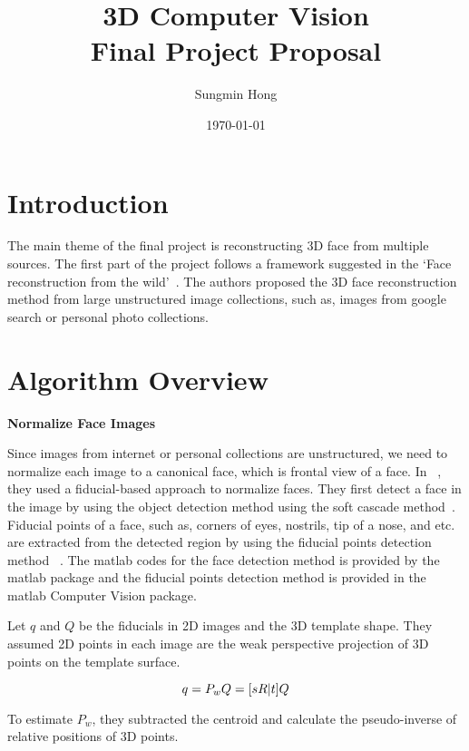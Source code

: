 \documentclass[10pt]{article}
\title{3D Computer Vision \\ Final Project Proposal}
\author{Sungmin Hong}
\date{\today}
\begin{document}
\maketitle

\section{Introduction}

The main theme of the final project is reconstructing 3D face from multiple sources. 
The first part of the project follows a framework suggested in the `Face reconstruction from the wild'~\cite{Kemel2011}.
The authors proposed the 3D face reconstruction method from large unstructured image collections, such as, images from google search or personal photo collections. 

\section{Algorithm Overview}

\noindent \textbf{Normalize Face Images \\} 

Since images from internet or personal collections are unstructured, we need to normalize each image to a canonical face, which is frontal view of a face.
In ~\cite{Kemel2011}, they used a fiducial-based approach to normalize faces. They first detect a face in the image by using the object detection method using the soft cascade method~\cite{Bourdev05}.
Fiducial points of a face, such as, corners of eyes, nostrils, tip of a nose, and etc. are extracted from the detected region by using the fiducial points detection method ~\cite{Everingham06}. 
The matlab codes for the face detection method is provided by the matlab package and the fiducial points detection method is provided in the matlab Computer Vision package. 

Let $q$ and $Q$ be the fiducials in 2D images and the 3D template shape. 
They assumed 2D points in each image are the weak perspective projection of 3D points on the template surface. 

\begin{equation}
    q = P_wQ = [ sR | t ]Q \\    
\label{eq1_1}
\end{equation}

To estimate $P_w$, they subtracted the centroid and calculate the pseudo-inverse of relative positions of 3D points.
\end{document}

